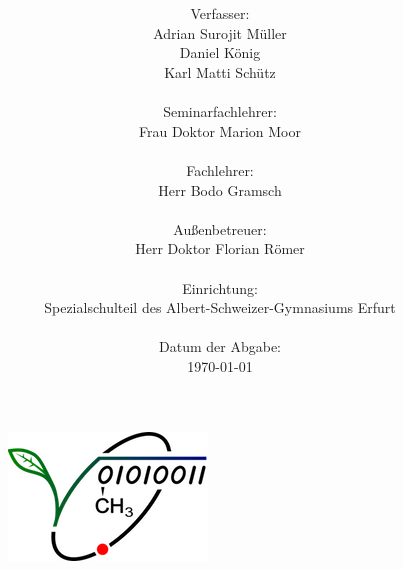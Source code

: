 \documentclass[a4paper,10pt,ngerman]{scrartcl}
\title{\vspace{2cm}\textbf{\Huge\Titel}\vspace{2cm}}
\author{
    \LARGE Verfasser: \\
        Adrian Surojit Müller \\
        Daniel König \\
        Karl Matti Schütz \\ \\
    \LARGE Seminarfachlehrer: \\
        Frau Doktor Marion Moor \\ \\ 
    \LARGE Fachlehrer: \\
        Herr Bodo Gramsch \\ \\
    \LARGE Außenbetreuer: \\
        Herr Doktor Florian Römer \\ \\
    \LARGE Einrichtung: \\
        Spezialschulteil des Albert-Schweizer-Gymnasiums Erfurt \\ \\
    \LARGE Datum der Abgabe: \\
        \today
}
\date{}
\begin{document}
\begin{figure}
  \centering
  \includegraphics[scale=3]{img/logo.png}
\end{figure}
\maketitle

\newpage
\tableofcontents
\end{document}
